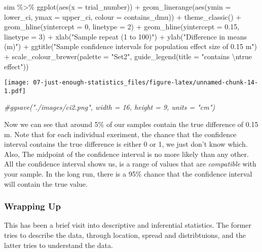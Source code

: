 \documentclass[
]{article}
\newenvironment{Shaded}{\begin{snugshade}}{\end{snugshade}}
\newcommand{\AttributeTok}[1]{\textcolor[rgb]{0.77,0.63,0.00}{#1}}
\newcommand{\CommentTok}[1]{\textcolor[rgb]{0.56,0.35,0.01}{\textit{#1}}}
\newcommand{\DecValTok}[1]{\textcolor[rgb]{0.00,0.00,0.81}{#1}}
\newcommand{\FloatTok}[1]{\textcolor[rgb]{0.00,0.00,0.81}{#1}}
\newcommand{\FunctionTok}[1]{\textcolor[rgb]{0.00,0.00,0.00}{#1}}
\newcommand{\NormalTok}[1]{#1}
\newcommand{\SpecialCharTok}[1]{\textcolor[rgb]{0.00,0.00,0.00}{#1}}
\newcommand{\StringTok}[1]{\textcolor[rgb]{0.31,0.60,0.02}{#1}}
\begin{document}
\begin{Shaded}
\begin{Highlighting}[]
\NormalTok{sim }\SpecialCharTok{\%\textgreater{}\%}
    \FunctionTok{ggplot}\NormalTok{(}\FunctionTok{aes}\NormalTok{(}\AttributeTok{x =}\NormalTok{ trial\_number)) }\SpecialCharTok{+}
    \FunctionTok{geom\_linerange}\NormalTok{(}\FunctionTok{aes}\NormalTok{(}\AttributeTok{ymin =}\NormalTok{ lower\_ci, }\AttributeTok{ymax =}\NormalTok{ upper\_ci, }\AttributeTok{colour =}\NormalTok{ contains\_dmu)) }\SpecialCharTok{+}
    \FunctionTok{theme\_classic}\NormalTok{() }\SpecialCharTok{+}
    \FunctionTok{geom\_hline}\NormalTok{(}\AttributeTok{yintercept =} \DecValTok{0}\NormalTok{, }\AttributeTok{linetype =} \DecValTok{2}\NormalTok{) }\SpecialCharTok{+}
  \FunctionTok{geom\_hline}\NormalTok{(}\AttributeTok{yintercept =} \FloatTok{0.15}\NormalTok{, }\AttributeTok{linetype =} \DecValTok{3}\NormalTok{) }\SpecialCharTok{+}
    \FunctionTok{xlab}\NormalTok{(}\StringTok{"Sample repeat (1 to 100)"}\NormalTok{) }\SpecialCharTok{+}
  \FunctionTok{ylab}\NormalTok{(}\StringTok{"Difference in means (m)"}\NormalTok{) }\SpecialCharTok{+}
  \FunctionTok{ggtitle}\NormalTok{(}\StringTok{"Sample confidence intervals for population effect size of 0.15 m"}\NormalTok{) }\SpecialCharTok{+}
  \FunctionTok{scale\_colour\_brewer}\NormalTok{(}\AttributeTok{palette =} \StringTok{"Set2"}\NormalTok{,}
                      \FunctionTok{guide\_legend}\NormalTok{(}\AttributeTok{title =} \StringTok{"contains }\SpecialCharTok{\textbackslash{}n}\StringTok{true effect"}\NormalTok{))}
\end{Highlighting}
\end{Shaded}

\texttt{[image: 07-just-enough-statistics\_files/figure-latex/unnamed-chunk-14-1.pdf]}

\begin{Shaded}
\begin{Highlighting}[]
\CommentTok{\#ggsave("./images/ci2.png", width = 16, height = 9, units = "cm")}
\end{Highlighting}
\end{Shaded}

Now we can see that around 5\% of our samples contain the true
difference of 0.15 m. Note that for each individual exeriment, the
chance that the confidence interval contains the true difference is
either 0 or 1, we just don't know which. Also, The midpoint of the
confidence interval is no more likely than any other. All the confidence
interval shows us, is a range of values that are \emph{compatible} with
your sample. In the long run, there is a 95\% chance that the confidence
interval will contain the true value.

\hypertarget{wrapping-up}{%
\subsubsection{Wrapping Up}\label{wrapping-up}}

This has been a brief visit into descriptive and inferential statistics.
The former tries to describe the data, through location, spread and
distribtuions, and the latter tries to understand the data.
\end{document}
